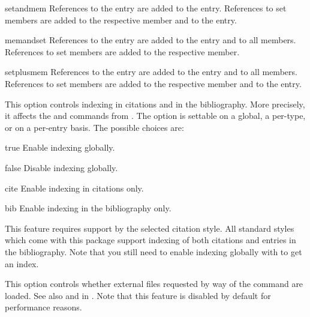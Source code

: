 \documentclass{ltxdockit}[2011/03/25]
\begin{document}
\begin{optionlist}
\begin{valuelist}
\item[setandmem] References to the  entry are added to the  entry. References to set members are added to the respective member and to the  entry.

\item[memandset] References to the  entry are added to the  entry and to all members. References to set members are added to the respective member.

\item[setplusmem] References to the  entry are added to the  entry and to all members. References to set members are added to the respective member and to the  entry.

\end{valuelist}


This option controls indexing in citations and in the bibliography. More precisely, it affects the  and  commands from . The option is settable on a global, a per-type, or on a per-entry basis. The possible choices are:

\begin{valuelist}
\item[true] Enable indexing globally.
\item[false] Disable indexing globally.
\item[cite] Enable indexing in citations only.
\item[bib] Enable indexing in the bibliography only.
\end{valuelist}

This feature requires support by the selected citation style. All standard styles which come with this package support indexing of both citations and entries in the bibliography. Note that you still need to enable indexing globally with  to get an index.


This option controls whether external files requested by way of the  command are loaded. See also  and  in . Note that this feature is disabled by default for performance reasons.



\end{optionlist}
\end{document}
